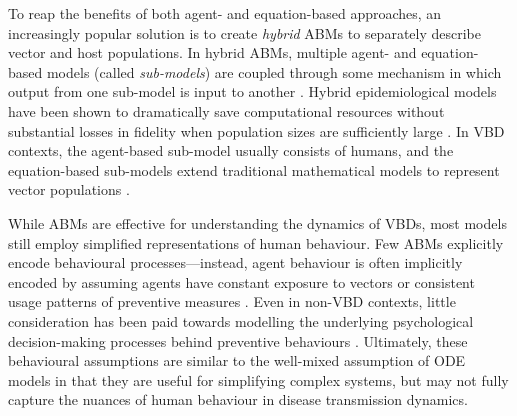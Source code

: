 To reap the benefits of both agent- and equation-based approaches, an increasingly popular solution is to create \textit{hybrid} ABMs to separately describe vector and host populations. In hybrid ABMs, multiple agent- and equation-based models (called \textit{sub-models}) are coupled through some mechanism in which output from one sub-model is input to another \cite{borshchev_system_2004}. Hybrid epidemiological models have been shown to dramatically save computational resources without substantial losses in fidelity when population sizes are sufficiently large \cite{bobashev_hybrid_2007, hunter_comparison_2018, hunter_hybrid_2020}. In VBD contexts, the agent-based sub-model usually consists of humans, and the equation-based sub-models extend traditional mathematical models to represent vector populations \cite{mniszewski_towards_2014, manore_network-patch_2015, mateus_c_modeling_2021}.



While ABMs are effective for understanding the dynamics of VBDs, most models still employ simplified representations of human behaviour. Few ABMs explicitly encode behavioural processes---instead, agent behaviour is often implicitly encoded by assuming agents have constant exposure to vectors or consistent usage patterns of preventive measures \cite{manore_network-patch_2015, dommar_agent-based_2014}. Even in non-VBD contexts, little consideration has been paid towards modelling the underlying psychological decision-making processes behind preventive behaviours \cite{weston_infection_2018}. Ultimately, these behavioural assumptions are similar to the well-mixed assumption of ODE models in that they are useful for simplifying complex systems, but may not fully capture the nuances of human behaviour in disease transmission dynamics.

